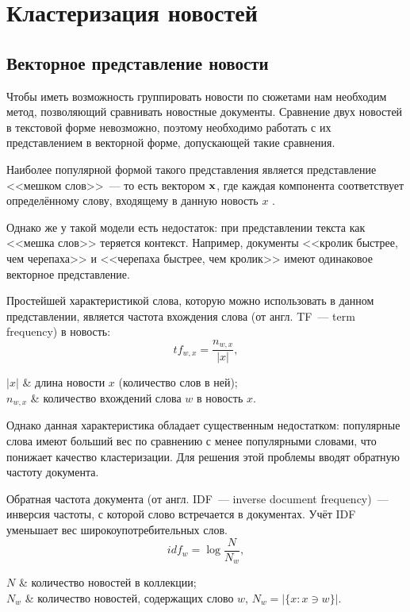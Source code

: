 \section{Кластеризация новостей}
\subsection{Векторное представление новости} \label{ssec:vectorization}
Чтобы иметь возможность группировать новости по сюжетами нам необходим метод, позволяющий сравнивать новостные документы. Сравнение двух новостей в текстовой форме невозможно, поэтому необходимо работать с их представлением в векторной форме, допускающей такие сравнения.

Наиболее популярной формой такого представления является представление <<мешком слов>>~--- то есть вектором $\boldsymbol{\mathbf{x}}$, где каждая компонента соответствует определённому слову, входящему в данную новость $x$ \cite{frakes92}.

Однако же у такой модели есть недостаток: при представлении текста как <<мешка слов>> теряется контекст. Например, документы <<кролик быстрее, чем черепаха>> и <<черепаха быстрее, чем кролик>> имеют одинаковое векторное представление.

Простейшей характеристикой слова, которую можно использовать в данном представлении, является частота вхождения слова (от англ. TF~--- term frequency) в новость:
\begin{equation} \label{eq:tf}
    tf_{w,x}=\frac{n_{w,x}}{|x|},
\end{equation}
\begin{conditions}
    $|x|$ & длина новости $x$ (количество слов в ней); \\
    $n_{w,x}$ & количество вхождений слова $w$ в новость $x$. \\
\end{conditions}

Однако данная характеристика обладает существенным недостатком: популярные слова имеют больший вес по сравнению с менее популярными словами, что понижает качество кластеризации. Для решения этой проблемы вводят обратную частоту документа.

Обратная частота документа (от англ. IDF~--- inverse document frequency)~--- инверсия частоты, с которой слово встречается в документах. Учёт IDF уменьшает вес широкоупотребительных слов.
\begin{equation} \label{eq:idf}
    idf_w=\log\frac{N}{N_w},
\end{equation}
\begin{conditions}
    $N$ & количество новостей в коллекции;\\
    $N_w$ & количество новостей, содержащих слово $w$, $N_w=|\{x: x\ni w\}|$.
\end{conditions}

